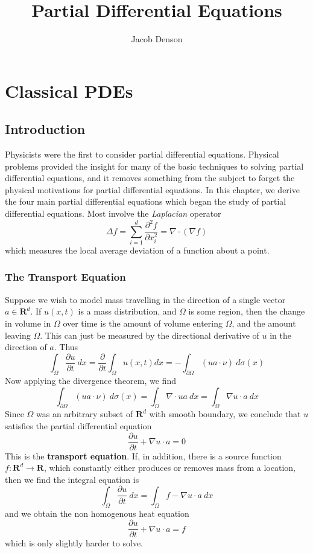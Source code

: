 

\title{Partial Differential Equations}
\author{Jacob Denson}




\maketitle

\tableofcontents


\part{Classical PDEs}

\chapter{Introduction}

Physicists were the first to consider partial differential equations. Physical problems provided the insight for many of the basic techniques to solving partial differential equations, and it removes something from the subject to forget the physical motivations for partial differential equations. In this chapter, we derive the four main partial differential equations which began the study of partial differential equations. Most involve the \emph{Laplacian} operator
%
\[ \Delta f = \sum_{i = 1}^d \frac{\partial^2 f}{\partial x_i^2} = \nabla \cdot (\nabla f) \]
%
which measures the local average deviation of a function about a point.

\section{The Transport Equation}

Suppose we wish to model mass travelling in the direction of a single vector $a \in \mathbf{R}^d$. If $u(x,t)$ is a mass distribution, and $\Omega$ is some region, then the change in volume in $\Omega$ over time is the amount of volume entering $\Omega$, and the amount leaving $\Omega$. This can just be measured by the directional derivative of $u$ in the direction of $a$. Thus
%
\[ \int_\Omega \frac{\partial u}{\partial t}\ dx = \frac{\partial}{\partial t} \int_\Omega u(x,t) dx = - \int_{\partial \Omega} (ua \cdot \nu)\ d\sigma(x) \]
%
Now applying the divergence theorem, we find
%
\[ \int_{\partial \Omega} (ua \cdot \nu)\ d\sigma(x) = \int_\Omega \nabla \cdot ua\  dx = \int_\Omega \nabla u \cdot a\ dx \]
%
Since $\Omega$ was an arbitrary subset of $\mathbf{R}^d$ with smooth boundary, we conclude that $u$ satisfies the partial differential equation
%
\[ \frac{\partial u}{\partial t} + \nabla u \cdot a = 0 \]
%
This is the {\bf transport equation}. If, in addition, there is a source function $f: \mathbf{R}^d \to \mathbf{R}$, which constantly either produces or removes mass from a location, then we find the integral equation is
%
\[ \int_\Omega \frac{\partial u}{\partial t}\ dx = \int_\Omega f - \nabla u \cdot a\ dx \]
%
and we obtain the non homogenous heat equation
%
\[ \frac{\partial u}{\partial t} + \nabla u \cdot a = f \]
%
which is only slightly harder to solve.


